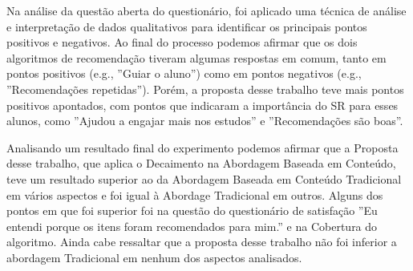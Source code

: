 Na análise da questão aberta do questionário, foi aplicado uma técnica de análise e interpretação de dados qualitativos
para identificar os principais pontos positivos e negativos. Ao final do processo podemos afirmar que os dois algoritmos
de recomendação tiveram algumas respostas em comum, tanto em pontos positivos (e.g., ''Guiar o aluno'') como em pontos
negativos (e.g., ''Recomendações repetidas''). Porém, a proposta desse trabalho teve mais pontos positivos apontados,
com pontos que indicaram a importância do SR para esses alunos, como ''Ajudou a engajar mais nos estudos'' e ''Recomendações são boas''.

Analisando um resultado final do experimento podemos afirmar que a Proposta desse trabalho, que aplica o Decaimento na
Abordagem Baseada em Conteúdo, teve um resultado superior ao da Abordagem Baseada em Conteúdo Tradicional em vários aspectos
e foi igual à Abordage Tradicional em outros. Alguns dos pontos em que foi superior foi na questão do questionário de satisfação
''Eu entendi porque os itens foram recomendados para mim.'' e na Cobertura do algoritmo. Ainda cabe ressaltar que a proposta
desse trabalho não foi inferior a abordagem Tradicional em nenhum dos aspectos analisados.
